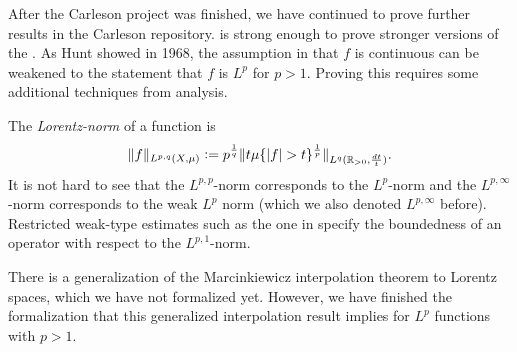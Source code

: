 \documentclass[12pt]{amsart}
\theoremstyle{definition}
\theoremstyle{plain}
\begin{document}
After the Carleson project was finished,
we have continued to prove further results in the Carleson repository.
 is strong enough to prove stronger versions of the .
As Hunt \cite{MR238019} showed in 1968,
the assumption in  that $f$ is continuous
can be weakened to the statement that $f$ is $L^p$ for $p>1$.
Proving this requires some additional techniques from analysis.

The \emph{Lorentz-norm} of a function is
$$\|f\|_{L^{p,q}(X,\mu)}\vcentcolon=
p^{\frac1q}\|t\mu\{|f| > t\}^{\frac1p}\|_{L^q(\mathbb{R}_{>0},\frac{dt}{t})}.$$
It is not hard to see that the $L^{p,p}$-norm corresponds to the $L^p$-norm
and the $L^{p,\infty}$-norm corresponds to the weak $L^p$ norm
(which we also denoted $L^{p,\infty}$ before).
Restricted weak-type estimates such as the one in 
specify the boundedness of an operator with respect to the $L^{p,1}$-norm.

There is a generalization of the Marcinkiewicz interpolation theorem to Lorentz spaces,
which we have not formalized yet.
However, we have finished the formalization that this generalized interpolation result
implies  for $L^p$ functions with $p>1$.

%
%
\printbibliography
\end{document}
